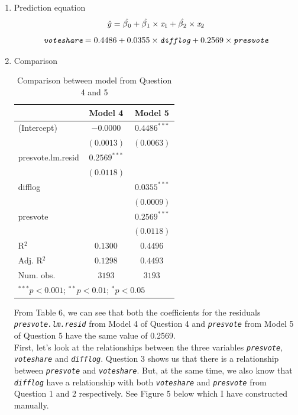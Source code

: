 \documentclass[12pt,letterpaper]{article}
\begin{document}
\begin{enumerate}
		\item Prediction equation
		$$\hat{y} = \hat{\beta\textsubscript{0}} + \hat{\beta\textsubscript{1}} \times \textit{x}\textsubscript{1} +\hat{\beta\textsubscript{2}} \times \textit{x}\textsubscript{2} $$
		$$ \textit{\texttt{voteshare}} = 0.4486 + 0.0355 \times \textit{\texttt{difflog}} + 0.2569 \times \textit{\texttt{presvote}} $$
		
		\item Comparison
		
		\begin{table}[H]
			\begin{center}
				\begin{tabular}{l c c}
					\hline
					& Model 4 & Model 5 \\
					\hline
					(Intercept)      & $-0.0000$      & $0.4486^{***}$ \\
					& $(0.0013)$     & $(0.0063)$     \\
					presvote.lm.resid & $0.2569^{***}$ &                \\
					& $(0.0118)$     &                \\
					difflog          &                & $0.0355^{***}$ \\
					&                & $(0.0009)$     \\
					presvote         &                & $0.2569^{***}$ \\
					&                & $(0.0118)$     \\
					\hline
					R$^2$            & $0.1300$       & $0.4496$       \\
					Adj. R$^2$       & $0.1298$       & $0.4493$       \\
					Num. obs.        & $3193$         & $3193$         \\
					\hline
					\multicolumn{3}{l}{\scriptsize{$^{***}p<0.001$; $^{**}p<0.01$; $^{*}p<0.05$}}
				\end{tabular}
				\caption{Comparison between model from Question 4 and 5}
				\label{table:coefficients}
			\end{center}
		\end{table}
	\hspace*{15pt} From Table 6, we can see that both the coefficients for the residuals \textit{\texttt{presvote.lm.resid}} from Model 4 of Question 4 and \textit{\texttt{presvote}} from Model 5 of Question 5 have the same value of 0.2569.\\
	\hspace*{15pt} First, let's look at the relationships between the three variables \textit{\texttt{presvote}}, \textit{\texttt{voteshare}} and \textit{\texttt{difflog}}. Question 3 shows us that there is a relationship between \textit{\texttt{presvote}} and \textit{\texttt{voteshare}}. But, at the same time, we also know that \textit{\texttt{difflog}} have a relationship with both \textit{\texttt{voteshare}} and \textit{\texttt{presvote}} from Question 1 and 2 respectively. See Figure 5 below which I have constructed manually.\\

\end{enumerate}
\end{document}
